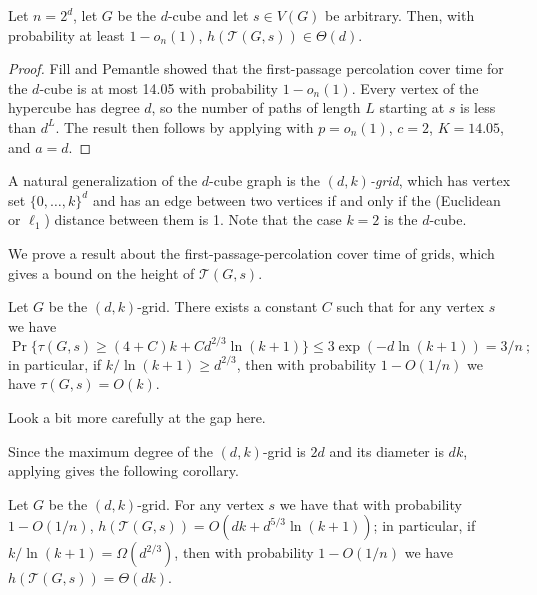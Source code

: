\documentclass{patmorin}
\newcommand{\abas}[1]{\textcolor{orange}{\big[Abbas: #1\big]}}
\newcommand{\tcal}{\mathcal{T}}
\begin{document}
\begin{thm}
  Let $n=2^d$, let $G$ be the $d$-cube and let $s\in V(G)$ be arbitrary. Then,
  with probability at least $1-o_n(1)$, $h(\tcal(G,s))\in \Theta(d)$.
\end{thm}

\begin{proof}
  Fill and Pemantle \cite{fill.pemantle:percolation} showed that the  first-passage percolation cover
  time for the $d$-cube is at most 14.05 with probability $1-o_n(1)$.
  Every vertex of the hypercube has degree $d$, so the number of paths
  of length $L$ starting at $s$ is less than $d^L$.  The result then follows
  by applying  with $p=o_n(1)$, $c=2$, $K=14.05$,
  and $a=d$.
\end{proof}

A natural generalization of the $d$-cube graph is 
the \emph{$(d,k)$-grid}, which has
vertex set $\{0,\ldots,k\}^d$ and has an edge between two vertices if
and only if the (Euclidean or $\ell_1$) distance between them is 1.
Note that the case $k=2$ is the $d$-cube.

We prove a result about the first-passage-percolation cover time of grids,
which gives a bound on the height of $\tcal(G,s)$.

\begin{thm}
Let $G$ be the $(d,k)$-grid.
There exists a constant $C$ such that for any vertex $s$ we have
\[
\Pr \{ \tau(G,s) \geq (4+C)k + Cd^{2/3}\ln(k+1) \} 
\leq
3 \exp (-d\ln(k+1)) =3/n \:;
\]
in particular, if $k/\ln(k+1) \geq d^{2/3}$,
then with probability $1-O(1/n)$ we have
$\tau(G,s)=O(k)$.
\end{thm}


\begin{todo}
Look a bit more carefully at the gap here.
\end{todo}

Since the maximum degree of the $(d,k)$-grid is $2d$ and its diameter is $dk$, applying  gives the following corollary.

\begin{cor}
Let $G$ be the $(d,k)$-grid.
For any vertex $s$ we have that with probability $1-O(1/n)$,
$ h(\tcal(G,s)) = O( dk + d^{5/3}\ln(k+1))$;
in particular, if $k/\ln(k+1) =\Omega(d^{2/3})$,
then with probability $1-O(1/n)$ we have
$h(\tcal(G,s))=\Theta(dk)$.
\end{cor}
\end{document}
